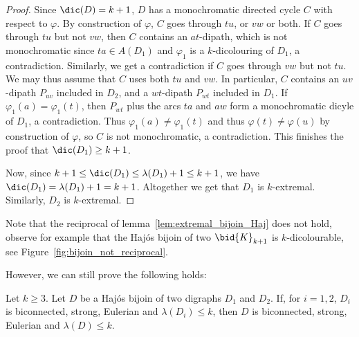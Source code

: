 \begin{proof}
    Since $\dic(D) = k+1$, $D$ has a monochromatic directed cycle $C$ with respect to $\varphi$. 
    By construction of $\varphi$, $C$ goes through $tu$, or $vw$ or both. 
    If $C$ goes through   $tu$ but not  $vw$, then $C$ contains an $at$-dipath, which is not monochromatic since $ta \in A(D_1)$ and $\varphi_1$ is a $k$-dicolouring of $D_1$, a contradiction.
    Similarly, we get a contradiction if $C$ goes through   $vw$ but not  $tu$. 
    We may thus assume that $C$ uses both $tu$ and $vw$. In particular, $C$ contains an $uv$-dipath $P_{uv}$ included in $D_2$, and a $wt$-dipath $P_{wt}$ included in $D_1$. 
    If $\varphi_1(a) = \varphi_1(t)$, then $P_{wt}$  plus the arcs $ta$ and $aw$ form a monochromatic dicyle of $D_1$, a contradiction. 
    Thus $\varphi_1(a) \neq \varphi_1(t)$ and thus $\varphi(t) \neq \varphi(u)$ by construction of $\varphi$, so $C$ is not monochromatic, a contradiction. This finishes the proof that  $\dic(D_1) \geq k+1$. 
    \smallskip 
    
    Now, since $k+1 \leq \dic(D_1) \leq \lambda(D_1) + 1 \leq k+1$, we have $\dic(D_1) = \lambda(D_1) + 1 = k+1$. Altogether we get that $D_1$ is $k$-extremal. Similarly, $D_2$ is $k$-extremal. 
\end{proof} 


Note that the reciprocal of lemma~\ref{lem:extremal_bijoin_Haj} does not hold, observe for example that the Haj\'os bijoin of two $\bid{K}_{k+1}$ is $k$-dicolourable, see Figure~\ref{fig:bijoin_not_reciprocal}.


However, we can still prove the following holds:

\begin{lemma}\label{lem:extremal_bijoin_Haj_only_if}
    Let $k \geq 3$. Let $D$ be a Haj\'os bijoin of two digraphs $D_1$ and $D_2$. If, for $i=1,2$,  $D_i$ is biconnected, strong, Eulerian and $\lambda(D_i) \leq k$, then $D$ is biconnected, strong,  Eulerian and $\lambda(D) \leq k$. 
\end{lemma}

